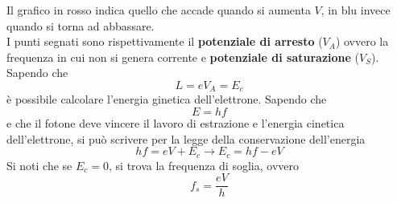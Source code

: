 \begin{center}
\end{center}
Il grafico in rosso indica quello che accade quando si aumenta $V$, in blu invece quando si torna
ad abbassare.\\
I punti segnati sono rispettivamente il \textbf{potenziale di arresto} ($V_A$) ovvero la frequenza
in cui non si genera corrente e \textbf{potenziale di saturazione} ($V_S$).\\
Sapendo che
\begin{equation*}
  L = eV_A = E_c
\end{equation*}
è possibile calcolare l'energia ginetica dell'elettrone. Sapendo che
\begin{equation*}
  E=hf
\end{equation*}
e che il fotone deve vincere il lavoro di estrazione e l'energia cinetica dell'elettrone, si può
scrivere per la legge della conservazione dell'energia
\begin{equation*}
  hf=eV+E_c \rightarrow E_c=hf-eV
\end{equation*}
Si noti che se $E_c=0$, si trova la frequenza di soglia, ovvero
\begin{equation*}
  f_s = \frac{eV}{h}
\end{equation*}

